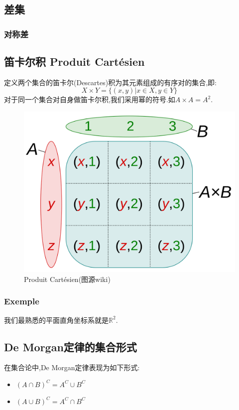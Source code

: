 \documentclass[12pt, a4paper, oneside]{ctexbook}
\begin{document}
  \subsection{差集}
  \subsubsection{对称差}

  \subsection{笛卡尔积 Produit Cartésien}
  定义两个集合的笛卡尔(Descartes)积为其元素组成的有序对的集合,即:
  $$
  X\times Y=\{(x,y)|x\in X,y\in Y\}
  $$对于同一个集合对自身做笛卡尔积,我们采用幂的符号.如$A\times A=A^2$.

  \begin{figure}[H]
    \centering
    \includegraphics[scale=0.05]{Produit_Cartesien.png}
    \caption{Produit Cartésien(图源wiki)}
    \label{myref:Produit_Cartesien}
  \end{figure}
  \subsubsection{Exemple}
  我们最熟悉的平面直角坐标系就是$\mathbb{R}^2$.
  \subsection{De Morgan定律的集合形式}
  在集合论中,De Morgan定律表现为如下形式:
  \begin{itemize}
    \item $(A\cap B)^C=A^C\cup B^C $
    \item $(A\cup B)^C=A^C\cap B^C $
  \end{itemize}
\end{document}
